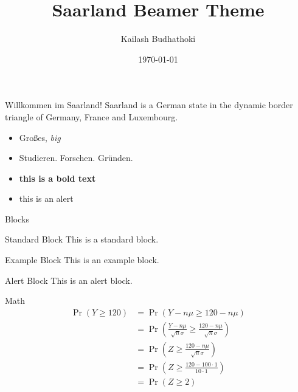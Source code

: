 \documentclass[12pt]{beamer}
\author{Kailash Budhathoki}
\title{Saarland Beamer Theme}
\institute{Max Planck Institute for Informatics and Saarland University}
\date{\today}
\begin{document}
	\begin{frame}
		\titlepage
	\end{frame}
	
	\begin{frame}{Willkommen im Saarland!}
	Saarland is a German state in the dynamic border triangle of Germany, France and Luxembourg. 
		\begin{itemize}
			\item Gro{\ss}es, \textit{big}
			\item Studieren. Forschen. Gr{\"u}nden.	
			\item \textbf{this is a bold text}
			\item \alert{this is an alert}
		\end{itemize}
	\end{frame}

	\begin{frame}{Blocks}
		\begin{block}{Standard Block}
			This is a standard block.
		\end{block}
		
		\begin{exampleblock}{Example Block}
			This is an example block.
		\end{exampleblock}
		
		\begin{alertblock}{Alert Block}
			This is an alert block.
		\end{alertblock}
	\end{frame}
	
	\begin{frame}{Math}
		\begin{align*}
			\Pr(Y \geq 120) &= \Pr\left(Y-n\mu \geq 120-n\mu \right)\\
			&= \Pr\left( \frac{Y-n\mu }{\sqrt{n}\sigma} \geq \frac{120-n\mu }{\sqrt{n}\sigma} \right)\\
			&=\Pr\left( Z \geq \frac{120-n\mu }{\sqrt{n}\sigma} \right)\\
			&=\Pr\left( Z \geq \frac{120-100 \cdot 1 }{10 \cdot 1} \right)\\
			&=\Pr\left( Z \geq 2\right)
		\end{align*}
	\end{frame}
\end{document}
